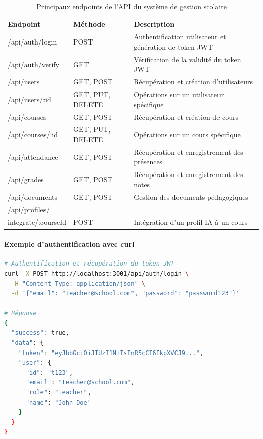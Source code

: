 \begin{table}[H]
\centering
\begin{tabular}{|p{3.5cm}|p{2cm}|p{8.5cm}|}
\hline
\textbf{Endpoint} & \textbf{Méthode} & \textbf{Description} \\
\hline
/api/auth/login & POST & Authentification utilisateur et génération de token JWT \\
\hline
/api/auth/verify & GET & Vérification de la validité du token JWT \\
\hline
/api/users & GET, POST & Récupération et création d'utilisateurs \\
\hline
/api/users/:id & GET, PUT, DELETE & Opérations sur un utilisateur spécifique \\
\hline
/api/courses & GET, POST & Récupération et création de cours \\
\hline
/api/courses/:id & GET, PUT, DELETE & Opérations sur un cours spécifique \\
\hline
/api/attendance & GET, POST & Récupération et enregistrement des présences \\
\hline
/api/grades & GET, POST & Récupération et enregistrement des notes \\
\hline
/api/documents & GET, POST & Gestion des documents pédagogiques \\
\hline
/api/profiles/\\integrate/:courseId & POST & Intégration d'un profil IA à un cours \\
\hline
\end{tabular}
\caption{Principaux endpoints de l'API du système de gestion scolaire}
\label{tab:school_api_endpoints}
\end{table}

\paragraph{Exemple d'authentification avec curl}

\begin{lstlisting}[style=codestyle, language=bash]
# Authentification et récupération du token JWT
curl -X POST http://localhost:3001/api/auth/login \
  -H "Content-Type: application/json" \
  -d '{"email": "teacher@school.com", "password": "password123"}'

# Réponse
{
  "success": true,
  "data": {
    "token": "eyJhbGciOiJIUzI1NiIsInR5cCI6IkpXVCJ9...",
    "user": {
      "id": "t123",
      "email": "teacher@school.com",
      "role": "teacher",
      "name": "John Doe"
    }
  }
}
\end{lstlisting}

